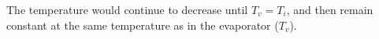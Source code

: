 The temperature would continue to decrease until \( T_v = T_i \), and then remain constant at the same temperature as in the evaporator (\( T_v \)).
